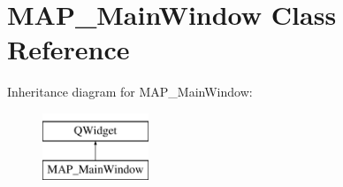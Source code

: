 \hypertarget{class_m_a_p___main_window}{}\section{M\+A\+P\+\_\+\+Main\+Window Class Reference}
\label{class_m_a_p___main_window}
Inheritance diagram for M\+A\+P\+\_\+\+Main\+Window\+:\begin{figure}[H]
\begin{center}
\leavevmode
\includegraphics[height=2.000000cm]{class_m_a_p___main_window}
\end{center}
\end{figure}
